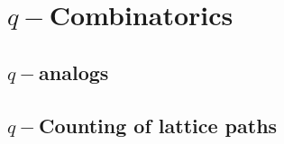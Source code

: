 \chapter{\texorpdfstring{$q-$}-Combinatorics}








\section{\texorpdfstring{$q-$}-analogs}

\section{\texorpdfstring{$q-$}-Counting of lattice paths}


\endinput
